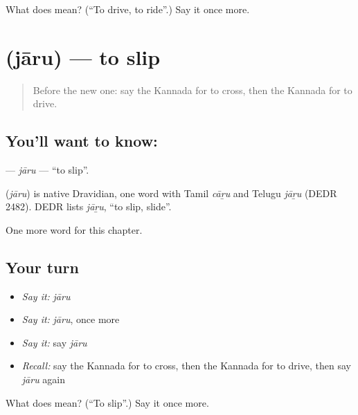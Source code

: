 \begin{tcolorbox}[breakable,colback=teal!4,colframe=teal!35!black,title={Before you move on}]
What does  mean? (\textquotedblleft{}To drive, to ride\textquotedblright{}.) Say it once more.
\end{tcolorbox}
\section[\texorpdfstring{\kn{ಜಾರು} (jāru)}{ಜಾರು (jāru)}]{ (jāru) — to slip}

\label{lesson:KA-C273-jaru}



\begin{quote}
Before the new one: say the Kannada for to cross, then the Kannada for to drive.
\end{quote}

\subsection*{You'll want to know: }
\textbf{} — \emph{jāru} — \textquotedblleft{}to slip\textquotedblright{}.

\begin{cousinweb}
\textbf{} (\emph{jāru}) is native Dravidian, one word with Tamil \emph{cāṟu} and Telugu \emph{jāṟu} (DEDR 2482). DEDR lists \emph{jāṟu}, \textquotedblleft{}to slip, slide\textquotedblright{}.
\end{cousinweb}

\begin{grammarlens}[title={What you've built}]
One more word for this chapter.
\end{grammarlens}

\subsection*{Your turn}
\begin{itemize}
\raggedright
  \item \emph{Say it:} \emph{jāru}
  \item \emph{Say it:} \emph{jāru}, once more
  \item \emph{Say it:} say \emph{jāru}
  \item \emph{Recall:} say the Kannada for to cross, then the Kannada for to drive, then say \emph{jāru} again
\end{itemize}

\begin{tcolorbox}[breakable,colback=teal!4,colframe=teal!35!black,title={Before you move on}]
What does  mean? (\textquotedblleft{}To slip\textquotedblright{}.) Say it once more.
\end{tcolorbox}

